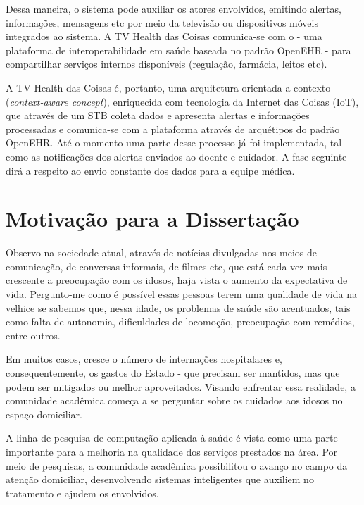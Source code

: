 Dessa maneira, o sistema pode auxiliar os atores envolvidos, emitindo alertas,
informações, mensagens etc por meio da televisão ou dispositivos móveis
integrados ao sistema. A TV Health das Coisas comunica-se com o \nextsaude[] - uma
plataforma de interoperabilidade em saúde baseada no padrão OpenEHR - para
compartilhar serviços internos disponíveis (regulação, farmácia, leitos etc).

A TV Health das Coisas é, portanto, uma arquitetura orientada a contexto
(\textit{context-aware concept}), enriquecida com tecnologia da Internet das
Coisas (IoT), que através de um STB coleta dados e apresenta alertas e
informações processadas e comunica-se com a plataforma \nextsaude[] através de
arquétipos do padrão OpenEHR.  Até o momento uma parte desse processo já foi
implementada, tal como as notificações dos alertas enviados ao doente e
cuidador. A fase seguinte dirá a respeito ao envio constante dos dados para a
equipe médica.


\section{Motivação para a Dissertação}\label{sec:motivacao}

Observo na sociedade atual, através de notícias divulgadas nos meios
de comunicação, de conversas informais, de filmes etc, que está cada
vez mais crescente a preocupação com os idosos, haja vista o
aumento da expectativa de vida. Pergunto-me como é possível essas pessoas
terem uma qualidade de vida na velhice se sabemos que, nessa idade,
os problemas de saúde são acentuados, tais como falta de autonomia,
dificuldades de locomoção, preocupação com remédios, entre outros.

Em muitos casos, cresce o número de internações hospitalares e,
consequentemente, os gastos do Estado - que precisam ser mantidos, mas que
podem ser mitigados ou melhor aproveitados.  Visando enfrentar essa realidade,
a comunidade acadêmica começa a se perguntar sobre os cuidados aos idosos no
espaço domiciliar.

A linha de pesquisa de computação aplicada à saúde é vista como uma parte
importante para a melhoria na qualidade dos serviços prestados na área. Por meio
de pesquisas, a comunidade acadêmica possibilitou o avanço no campo da atenção
domiciliar, desenvolvendo sistemas inteligentes que auxiliem no tratamento e
ajudem os envolvidos.

